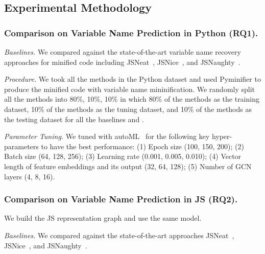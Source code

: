 \subsection{Experimental Methodology}
\label{empirical-method}

\subsubsection{Comparison on Variable Name Prediction in Python (RQ1).\\}
{\em Baselines.} We compared {\tool} against the state-of-the-art
variable name recovery approaches for minified code including
JSNeat~\cite{icse19}, JSNice~\cite{JSNice2015}, and
JSNaughty~\cite{JSNaughty2017}.

\textit{Procedure.} We took all the methods in the Python dataset
and used Pyminifier to produce the minified code with variable name
mininification. We randomly split all the methods into 80\%, 10\%,
10\% in which 80\% of the methods as the training dataset, 10\% of the
methods as the tuning dataset, and 10\% of the methods as the testing
dataset for all the baselines and {\tool}.


{\em Parameter Tuning.} We tuned {\tool} with autoML~\cite{NNI} for
the following key hyper-parameters to have the best performance: (1)
Epoch size (100, 150, 200); (2) Batch size (64, 128, 256); (3)
Learning rate (0.001, 0.005, 0.010); (4) Vector length of feature
embeddings and its output (32, 64, 128); (5) Number of GCN layers (4,
8, 16).

    
\subsubsection{Comparison on Variable Name Prediction in JS (RQ2).\\}

We build the JS representation graph and use the same model.
    
{\em Baselines.} We compared {\tool} against the state-of-the-art
approaches JSNeat~\cite{icse19}, JSNice~\cite{JSNice2015}, and
JSNaughty~\cite{JSNaughty2017}.

